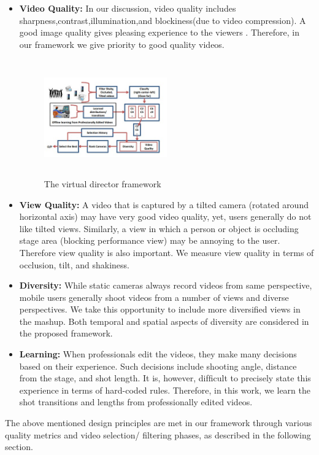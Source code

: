 \documentclass{sig-alternate}
\begin{document}
\begin{itemize}
\item  \textbf{Video Quality:} In our discussion, video quality includes sharpness,contrast,illumination,and blockiness(due to video compression). A good image quality gives pleasing experience to the viewers \cite{piron1976foundations}. Therefore, in our framework we give priority to good quality videos. 
 \begin{figure}[h]
\includegraphics[width=0.5\textwidth ,height = 5cm]{image2}
\caption{The virtual director framework}
\label{fig:figure2}
\end{figure}

\item \textbf{View Quality:} A video that is captured by a tilted camera (rotated around horizontal axis) may have very good video quality, yet, users generally do not like tilted views. Similarly, a view in which a person or object is occluding stage area (blocking performance view) may be annoying to the user. Therefore view quality is also important. We measure view quality in terms of occlusion, tilt, and shakiness. 
\item \textbf{Diversity:} While static cameras always record videos from same perspective, mobile users generally shoot videos from a number of views and diverse perspectives. We take this opportunity to include more diversiﬁed views in the mashup. Both temporal and spatial aspects of diversity are considered in the proposed framework. 
\item \textbf{Learning:} When professionals edit the videos, they make many decisions based on their experience. Such decisions include shooting angle, distance from the stage, and shot length. It is, however, difﬁcult to precisely state this experience in terms of hard-coded rules. Therefore, in this work, we learn the shot transitions and lengths from professionally edited videos.
\end{itemize}

The above mentioned design principles are met in our framework through various quality metrics and video selection/ ﬁltering phases, as described in the following section.
\end{document}
